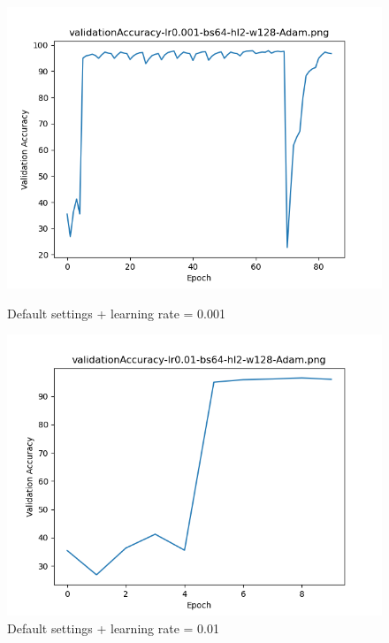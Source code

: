 \documentclass{article}[12pt]
\begin{document}
    \begin{figure}[H]
        \includegraphics[width=\linewidth]{testsResults/validationAccuracy/def.png}
        \caption{Default settings + learning rate = 0.001}
        \endminipage\hfill
        \includegraphics[width=\linewidth]{testsResults/validationAccuracy/validationAccuracy-lr0.01-bs64-hl2-w128-Adam.png}
        \caption{Default settings + learning rate = 0.01}
        \endminipage
    \end{figure}
\end{document}
